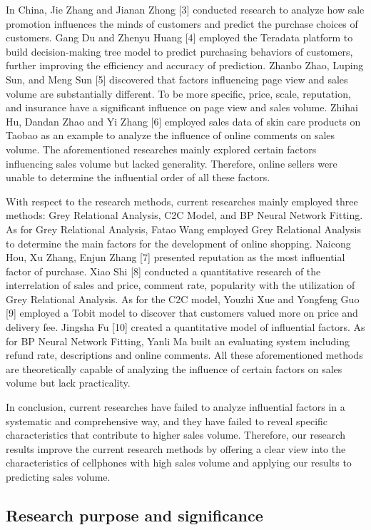 In China, Jie Zhang and Jianan Zhong [3] conducted research to analyze how sale promotion influences the minds of customers and predict the purchase choices of customers. Gang Du and Zhenyu Huang [4] employed the Teradata platform to build decision-making tree model to predict purchasing behaviors of customers, further improving the efficiency and accuracy of prediction. Zhanbo Zhao, Luping Sun, and Meng Sun [5] discovered that factors influencing page view and sales volume are substantially different. To be more specific, price, scale, reputation, and insurance have a significant influence on page view and sales volume. Zhihai Hu, Dandan Zhao and Yi Zhang [6] employed sales data of skin care products on Taobao as an example to analyze the influence of online comments on sales volume. The aforementioned researches mainly explored certain factors influencing sales volume but lacked generality. Therefore, online sellers were unable to determine the influential order of all these factors.

With respect to the research methods, current researches mainly employed three methods: Grey Relational Analysis, C2C Model, and BP Neural Network Fitting. As for Grey Relational Analysis, Fatao Wang employed Grey Relational Analysis to determine the main factors for the development of online shopping. Naicong Hou, Xu Zhang, Enjun Zhang [7] presented reputation as the most influential factor of purchase. Xiao Shi [8] conducted a quantitative research of the interrelation of sales and price, comment rate, popularity with the utilization of Grey Relational Analysis. As for the C2C model, Youzhi Xue and Yongfeng Guo [9] employed a Tobit model to discover that customers valued more on price and delivery fee. Jingsha Fu [10] created a quantitative model of influential factors. As for BP Neural Network Fitting, Yanli Ma built an evaluating system including refund rate, descriptions and online comments. All these aforementioned methods are theoretically capable of analyzing the influence of certain factors on sales volume but lack practicality.

In conclusion, current researches have failed to analyze influential factors in a systematic and comprehensive way, and they have failed to reveal specific characteristics that contribute to higher sales volume. Therefore, our research results improve the current research methods by offering a clear view into the characteristics of cellphones with high sales volume and applying our results to predicting sales volume.

\subsection{Research purpose and significance}

